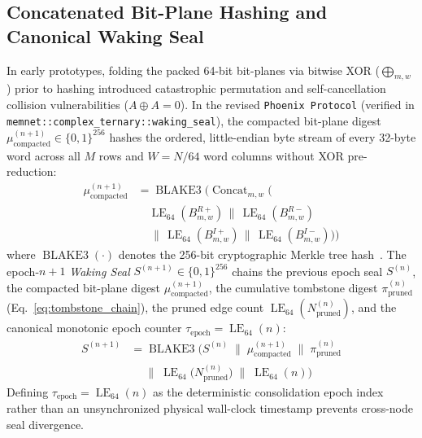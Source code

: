 \documentclass[10pt, twocolumn, a4paper]{article}
\begin{document}
\subsection{Concatenated Bit-Plane Hashing and Canonical Waking Seal}
In early prototypes, folding the packed 64-bit bit-planes via bitwise XOR ($\bigoplus_{m,w}$) prior to hashing introduced catastrophic permutation and self-cancellation collision vulnerabilities ($A \oplus A = 0$). In the revised \texttt{Phoenix Protocol} (verified in \texttt{memnet::complex\_ternary::waking\_seal}), the compacted bit-plane digest $\mu_{\text{compacted}}^{(n+1)} \in \{0,1\}^{256}$ hashes the ordered, little-endian byte stream of every 32-byte word across all $M$ rows and $W = N/64$ word columns without XOR pre-reduction:
\begin{equation}
\begin{split}
\mu_{\text{compacted}}^{(n+1)} &= \operatorname{BLAKE3}\Big(\operatorname{Concat}_{m,w}\big( \\
&\quad \operatorname{LE}_{64}(B_{m,w}^{R+}) \,\|\, \operatorname{LE}_{64}(B_{m,w}^{R-}) \\
&\quad \,\|\, \operatorname{LE}_{64}(B_{m,w}^{I+}) \,\|\, \operatorname{LE}_{64}(B_{m,w}^{I-})\big)\Big)
\end{split}
\label{eq:blake3_concat}
\end{equation}
where $\operatorname{BLAKE3}(\cdot)$ denotes the 256-bit cryptographic Merkle tree hash~\cite{oconnor2020blake3}. The epoch-$n+1$ \emph{Waking Seal} $S^{(n+1)} \in \{0,1\}^{256}$ chains the previous epoch seal $S^{(n)}$, the compacted bit-plane digest $\mu_{\text{compacted}}^{(n+1)}$, the cumulative tombstone digest $\pi_{\text{pruned}}^{(n)}$ (Eq.~\ref{eq:tombstone_chain}), the pruned edge count $\operatorname{LE}_{64}(N_{\text{pruned}}^{(n)})$, and the canonical monotonic epoch counter $\tau_{\text{epoch}} = \operatorname{LE}_{64}(n)$:
\begin{equation}
\begin{split}
S^{(n+1)} &= \operatorname{BLAKE3}\Big(
    S^{(n)} \;\|\; \mu_{\text{compacted}}^{(n+1)} \;\|\; \pi_{\text{pruned}}^{(n)} \\
    &\quad \;\|\; \operatorname{LE}_{64}\!\big(N_{\text{pruned}}^{(n)}\big) \;\|\; \operatorname{LE}_{64}(n)
\Big)
\end{split}
\label{eq:waking_seal}
\end{equation}
Defining $\tau_{\text{epoch}} = \operatorname{LE}_{64}(n)$ as the deterministic consolidation epoch index rather than an unsynchronized physical wall-clock timestamp prevents cross-node seal divergence.
\end{document}
